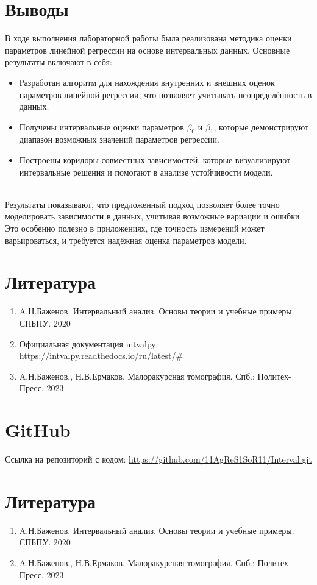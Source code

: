 \documentclass[a4paper,12pt]{article}
\begin{document}
\newpage
\section{Выводы}
  В ходе выполнения лабораторной работы была реализована методика оценки
  параметров линейной регрессии на основе интервальных данных. Основные
  результаты включают в себя:

  \begin{itemize}
    \item Разработан алгоритм для нахождения внутренних и внешних оценок
      параметров линейной регрессии, что позволяет учитывать
      неопределённость в данных.
    \item Получены интервальные оценки параметров \( \beta_0 \) и
      \( \beta_1 \), которые демонстрируют диапазон возможных значений
      параметров регрессии.
    \item Построены коридоры совместных зависимостей, которые
      визуализируют интервальные решения и помогают в анализе устойчивости
      модели.
  \end{itemize}\\
  Результаты показывают, что предложенный подход позволяет более точно
  моделировать зависимости в данных, учитывая возможные вариации и ошибки.
  Это особенно полезно в приложениях, где точность измерений может
  варьироваться, и требуется надёжная оценка параметров модели.
\section{Литература}
\begin{enumerate}
    \item A.Н.Баженов. Интервальный анализ. Основы теории и учебные примеры. СПБПУ. 2020
    \item Официальная документация intvalpy: \url{https://intvalpy.readthedocs.io/ru/latest/#} 
    \item A.Н.Баженов., Н.В.Ермаков. Малоракурсная томография. Спб.: Политех-Пресс. 2023.  
\end{enumerate}

\section{GitHub}
Ссылка на репозиторий с кодом: \url{https://github.com/11AgReS1SoR11/Interval.git} \\

\section{Литература}
\begin{enumerate}
    \item A.Н.Баженов. Интервальный анализ. Основы теории и учебные примеры. СПБПУ. 2020
    \item A.Н.Баженов., Н.В.Ермаков. Малоракурсная томография. Спб.: Политех-Пресс. 2023.  
\end{enumerate}
\end{document}
